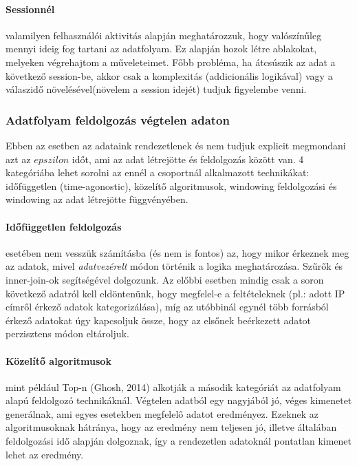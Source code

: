 \documentclass[a4paper,12pt]{article}
\begin{document}
\paragraph{Sessionnél}\hspace*{-0.4cm} valamilyen felhasználói aktivitás alapján meghatározzuk, hogy valószínűleg mennyi ideig fog tartani az adatfolyam. Ez alapján hozok létre ablakokat, melyeken végrehajtom a műveleteimet. Főbb probléma, ha átcsúszik az adat a következő session-be, akkor csak a komplexitás (addicionális logikával) vagy a válaszidő növelésével(növelem a session idejét) tudjuk figyelembe venni.

\subsubsection{Adatfolyam feldolgozás végtelen adaton}
Ebben az esetben az adataink rendezetlenek és nem tudjuk explicit megmondani azt az $epszilon$ időt, ami az adat létrejötte és feldolgozás között van. 4 kategóriába lehet sorolni az ennél a csoportnál alkalmazott technikákat: időfüggetlen (time-agonostic), közelítő algoritmusok, windowing feldolgozási és windowing az adat létrejötte függvényében. 

\paragraph{Időfüggetlen feldolgozás}\hspace*{-0.4cm} esetében nem vesszük számításba (és nem is fontos) az, hogy mikor érkeznek meg az adatok, mivel \textsl{adatvezérelt} módon történik a logika meghatározása. Szűrők és inner-join-ok segítségével dolgozunk. Az előbbi esetben mindig csak a soron következő adatról kell eldöntenünk, hogy megfelel-e a feltételeknek (pl.: adott IP címről érkező adatok kategorizálása), míg az utóbbinál egynél több forrásból érkező adatokat úgy kapcsoljuk össze, hogy az elsőnek beérkezett adatot perzisztens módon eltároljuk. 

\paragraph{Közelítő algoritmusok}\hspace*{-0.4cm} mint például Top-n (Ghosh, 2014) alkotják a második kategóriát az adatfolyam alapú feldolgozó technikáknál. Végtelen adatból egy nagyjából jó, véges kimenetet generálnak, ami egyes esetekben megfelelő adatot eredményez. Ezeknek az algoritmusoknak hátránya, hogy az eredmény nem teljesen jó, illetve általában feldolgozási idő alapján dolgoznak, így a rendezetlen adatoknál pontatlan kimenet lehet az eredmény.
\end{document}
